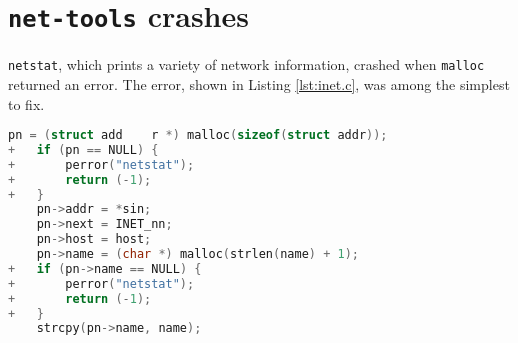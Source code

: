 \section{\texttt{net-tools} crashes}
\label{appendix:net-tools}

\texttt{netstat}, which prints a variety of network information, crashed when \texttt{malloc} returned an error. The error, shown in Listing \ref{lst:inet.c}, was among the simplest to fix.

\begin{lstlisting}[label={lst:inet.c},firstnumber=213, caption={\texttt{lib/inet.c}}, language=C]
    pn = (struct add	r *) malloc(sizeof(struct addr));
+   if (pn == NULL) {
+   	perror("netstat");
+		return (-1);
+   }
    pn->addr = *sin;
    pn->next = INET_nn;
    pn->host = host;
    pn->name = (char *) malloc(strlen(name) + 1);
+   if (pn->name == NULL) {
+   	perror("netstat");
+		return (-1);
+   }
    strcpy(pn->name, name);
\end{lstlisting}
